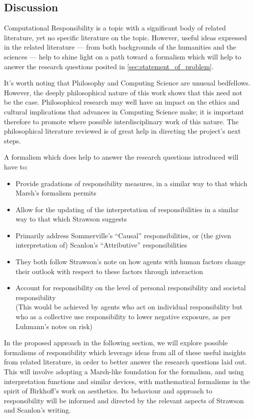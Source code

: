 \subsection{Discussion}
Computational Responsibility is a topic with a significant body of related literature, yet no specific literature on the topic. However, useful ideas expressed in the related literature --- from both backgrounds of the humanities and the sciences --- help to shine light on a path toward a formalism which will help to answer the research questions posited in \cref{sec:statement_of_problem}.\par

It's worth noting that Philosophy and Computing Science are unusual bedfellows. However, the deeply philosophical nature of this work shows that this need not be the case. Philosophical research may well have an impact on the ethics and cultural implications that advances in Computing Science make; it is important therefore to promote where possible interdisciplinary work of this nature. The philosophical literature reviewed is of great help in directing the project's next steps.\par

A formalism which does help to answer the research questions introduced will have to:

\begin{itemize}
    \item Provide gradations of responsibility measures, in a similar way to that which Marsh's formalism permits
    \item Allow for the updating of the interpretation of responsibilities in a similar way to that which Strawson suggests
    \item Primarily address Sommerville's ``Causal'' responsibilities, or (the given interpretation of) Scanlon's ``Attributive'' responsibilities
    \item They both follow Strawson's note on how agents with human factors change their outlook with respect to these factors through interaction
    \item Account for responsibility on the level of personal responsibility and societal responsibility\\
        (This would be achieved by agents who act on individual responsibility but who as a collective use responsibility to lower negative exposure, as per Luhmann's notes on risk)
\end{itemize}

In the proposed approach in the following section, we will explore possible formalisms of responsibility which leverage ideas from all of these useful insights from related literature, in order to better answer the research questions laid out. This will involve adopting a Marsh-like foundation for the formalism, and using interpretation functions and similar devices, with mathematical formalisms in the spirit of Birkhoff's work on aesthetics. Its behaviour and approach to responsibility will be informed and directed by the relevant aspects of Strawson and Scanlon's writing.\par

